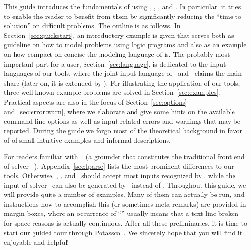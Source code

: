 This guide introduces the fundamentals of using
\gringo, \clasp, \clingo, and \iclingo.
In particular, it tries to enable the reader to benefit from them
by significantly reducing the ``time to solution'' on difficult problems.
The outline is as follows.
In Section~\ref{sec:quickstart},
an introductory example is given
that serves both as guideline on how to model problems using logic programs
and also as an example on how compact on concise the modeling language of \gringo is.
The probably most important part for a user, Section~\ref{sec:language},
is dedicated to the input languages of our tools,
where the joint input language of \gringo\ and \clingo\
claims the main share (later on, it is extended by \iclingo).
For illustrating the application of our tools,
three well-known example problems are solved in Section~\ref{sec:examples}.
Practical aspects are also in the focus of Section~\ref{sec:options} and~\ref{sec:error:warn},
where we elaborate and give some hints on the available command line options
as well as input-related errors and warnings that may be reported.
During the guide we forgo most of the theoretical background in favor of
of small intuitive examples and informal descriptions.

For readers familiar with \lparse~\cite{lparseManual}
(a grounder that constitutes the traditional front end of solver \smodels~\cite{siniso02a}),
Appendix~\ref{sec:lparse} lists the most prominent differences to our tools.
Otherwise, \gringo, \clingo, and \iclingo\ should accept most inputs recognized by \lparse,
while the input of solver \clasp\ can also be generated by \lparse\ instead of \gringo.
Throughout this guide, we will provide quite a number of examples.
Many of them can actually be run, and instructions how to accomplish this
(or sometimes meta-remarks)
are provided in margin boxes, where an occurrence of ``''
usually means that a text line broken for space reasons is actually continuous.
After all these preliminaries, it is time to start our guided tour
through Potassco~\cite{potassco}.
We sincerely hope that you will find it enjoyable and helpful!

